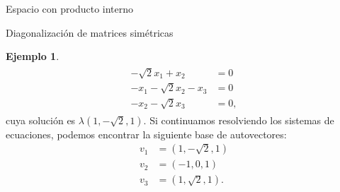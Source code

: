 \documentclass[a4paper,12pt,twoside,spanish,reqno]{amsbook}
\theoremstyle{definition}
\newtheorem{ejemplo}{Ejemplo}[section]
\theoremstyle{remark}
\begin{document}
\begin{chapter}{Espacio con producto interno}
\begin{section}{Diagonalización de matrices simétricas}
\begin{ejemplo}
\begin{align*}
        \begin{split}
        -\sqrt 2x_1+ x_2  &= 0 \\
        -x_1 -\sqrt 2x_2  -x_3 &=0 \\
        -x_2 -\sqrt 2x_3 &= 0,  
        \end{split}
        \end{align*}
        cuya solución es $\lambda(1, -\sqrt2, 1)$. Si continuamos resolviendo los sistemas de ecuaciones, podemos encontrar la siguiente base de autovectores:
        \begin{align*}
        v_1 &= (1, -\sqrt2, 1) \\		
        v_2 &= (-1, 0, 1) \\		
        v_3 &= (1, \sqrt2, 1).
        \end{align*}
        
    \end{ejemplo}
    
    \end{section}

\end{chapter}



\appendix
\setcounter{chapter}{0}
\renewcommand{\thechapter}{\Alph{chapter}}
\end{document}
